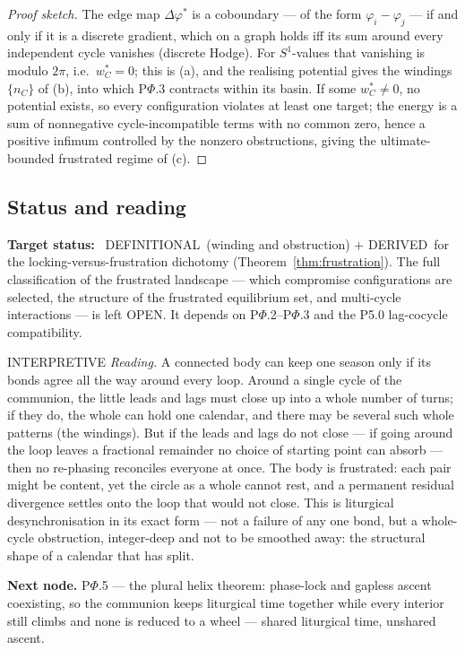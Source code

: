 \documentclass[11pt,a4paper]{article}
\newcommand{\stDerived}{\textcolor{cDer}{\textsf{\small DERIVED}}}
\newcommand{\stDef}{\textcolor{cDef}{\textsf{\small DEFINITIONAL}}}
\newcommand{\stInterp}{\textcolor{cInt}{\textsf{\small INTERPRETIVE}}}
\newcommand{\stOpen}{\textcolor{cOpn}{\textsf{\small OPEN}}}
\theoremstyle{definition}
\theoremstyle{plain}
\theoremstyle{remark}
\begin{document}
\begin{proof}[Proof sketch]
The edge map \(\Delta\varphi^{*}\) is a coboundary --- of the form \(\varphi_i-\varphi_j\) ---
if and only if it is a discrete gradient, which on a graph holds iff its sum around every
independent cycle vanishes (discrete Hodge). For \(S^1\)-values that vanishing is modulo
\(2\pi\), i.e.\ \(w_C^{*}=0\); this is (a), and the realising potential gives the windings
\(\{n_C\}\) of (b), into which P$\Phi$.3 contracts within its basin. If some
\(w_C^{*}\neq0\), no potential exists, so every configuration violates at least one target;
the energy is a sum of nonnegative cycle-incompatible terms with no common zero, hence a
positive infimum controlled by the nonzero obstructions, giving the ultimate-bounded
frustrated regime of (c). \qedhere
\end{proof}

\subsection{Status and reading}

\textbf{Target status:}~
\stDef\ (winding and obstruction) \(+\) \stDerived\ for the locking-versus-frustration
dichotomy (Theorem~\ref{thm:frustration}). The full classification of the frustrated landscape
--- which compromise configurations are selected, the structure of the frustrated equilibrium
set, and multi-cycle interactions --- is left \stOpen. It depends on P$\Phi$.2--P$\Phi$.3 and
the P5.0 lag-cocycle compatibility.

\medskip
\stInterp\quad
\emph{Reading.}
A connected body can keep one season only if its bonds agree all the way around every loop.
Around a single cycle of the communion, the little leads and lags must close up into a whole
number of turns; if they do, the whole can hold one calendar, and there may be several such
whole patterns (the windings). But if the leads and lags do not close --- if going around the
loop leaves a fractional remainder no choice of starting point can absorb --- then no
re-phasing reconciles everyone at once. The body is frustrated: each pair might be content,
yet the circle as a whole cannot rest, and a permanent residual divergence settles onto the
loop that would not close. This is liturgical desynchronisation in its exact form --- not a
failure of any one bond, but a whole-cycle obstruction, integer-deep and not to be smoothed
away: the structural shape of a calendar that has split.

\medskip
\textbf{Next node.} P$\Phi$.5 --- the plural helix theorem: phase-lock and gapless ascent
coexisting, so the communion keeps liturgical time together while every interior still climbs
and none is reduced to a wheel --- shared liturgical time, unshared ascent.
\end{document}
